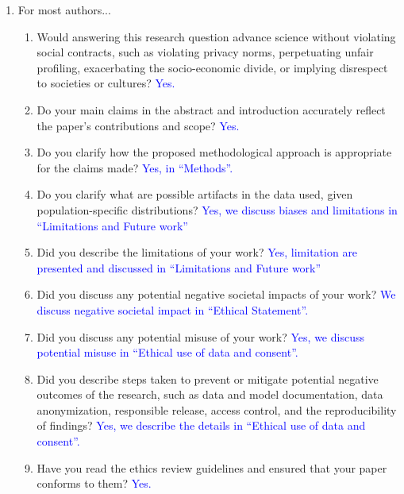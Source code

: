 \documentclass[letterpaper]{article} %
\newcommand{\answerYes}[1]{\textcolor{blue}{#1}}
\begin{document}
\begin{enumerate}

\item For most authors...
\begin{enumerate}
    \item  Would answering this research question advance science without violating social contracts, such as violating privacy norms, perpetuating unfair profiling, exacerbating the socio-economic divide, or implying disrespect to societies or cultures?
    \answerYes{Yes.}
  \item Do your main claims in the abstract and introduction accurately reflect the paper's contributions and scope?
    \answerYes{Yes.}
   \item Do you clarify how the proposed methodological approach is appropriate for the claims made? 
    \answerYes{Yes, in ``Methods''.}
   \item Do you clarify what are possible artifacts in the data used, given population-specific distributions?
    \answerYes{Yes, we discuss biases and limitations in ``Limitations and Future work''}
  \item Did you describe the limitations of your work?
    \answerYes{Yes, limitation are presented and discussed in ``Limitations and Future work''}
  \item Did you discuss any potential negative societal impacts of your work?
    \answerYes{We discuss negative societal impact in ``Ethical Statement''.}
      \item Did you discuss any potential misuse of your work?
    \answerYes{Yes, we discuss potential misuse in ``Ethical use of data and consent''.}
    \item Did you describe steps taken to prevent or mitigate potential negative outcomes of the research, such as data and model documentation, data anonymization, responsible release, access control, and the reproducibility of findings?
    \answerYes{Yes, we describe the details in ``Ethical use of data and consent''.}
  \item Have you read the ethics review guidelines and ensured that your paper conforms to them?
    \answerYes{Yes.}
\end{enumerate}


\end{enumerate}
\end{document}
